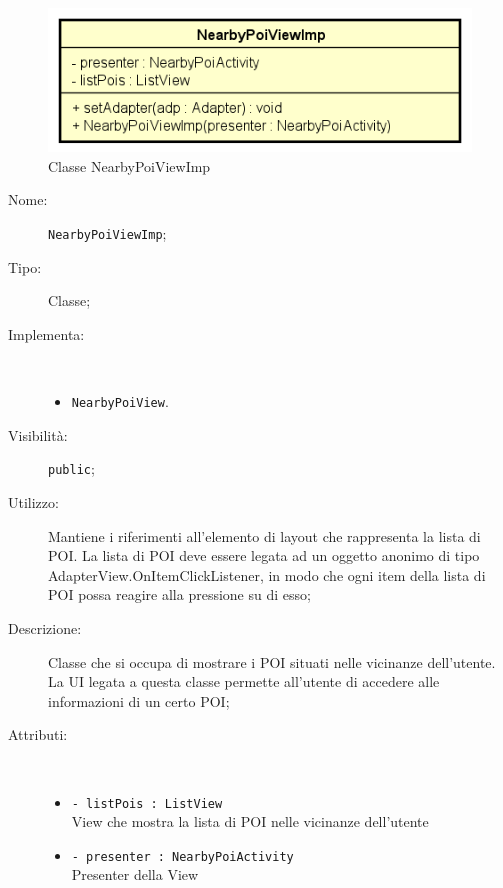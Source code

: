\documentclass[../DefinizioneDiProdotto.tex]{subfiles}
\begin{document}
    \begin{figure}[H]
        \centering
        \includegraphics{img/NearbyPoiViewImp.png}
        \caption{Classe NearbyPoiViewImp}\label{fig:view::NearbyPoiViewImp} 
    \end{figure}
    \begin{description}
\item[Nome:] \texttt{NearbyPoiViewImp};
\item[Tipo:] Classe;
\item[Implementa:] \
\begin{itemize}
\item \texttt{NearbyPoiView}.

\end{itemize}
\item[Visibilità:] \texttt{public};
\item[Utilizzo:] Mantiene i riferimenti all'elemento di layout che rappresenta la lista di POI. La lista di POI deve essere legata ad un oggetto anonimo di tipo AdapterView.OnItemClickListener, in modo che ogni item della lista di POI possa reagire alla pressione su di esso;
\item[Descrizione:] Classe che si occupa di mostrare i POI situati nelle vicinanze dell'utente. La UI legata a questa classe permette all'utente di accedere alle informazioni di un certo POI;
\item[Attributi:] \
\begin{itemize}
\item \texttt{- listPois : ListView}\\
View che mostra la lista di POI nelle vicinanze dell'utente

\item \texttt{- presenter : NearbyPoiActivity}\\
Presenter della View


\end{itemize}
\end{description}
\end{document}
